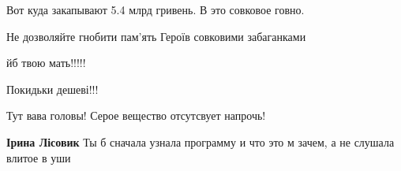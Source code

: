\begin{itemize}
 
Вот куда закапывают 5.4 млрд гривень. В это совковое говно. 🙁

 
Не дозволяйте гнобити пам’ять Героїв совковими забаганками

 
йб твою мать!!!!!

 
Покидьки дешеві!!!

 
Тут вава головы! Серое вещество отсутсвует напрочь!

\begin{itemize}
 
\textbf{Ірина Лісовик} Ты б сначала узнала программу и что это м зачем, а не слушала влитое в уши

 

\end{itemize}
\end{itemize}
